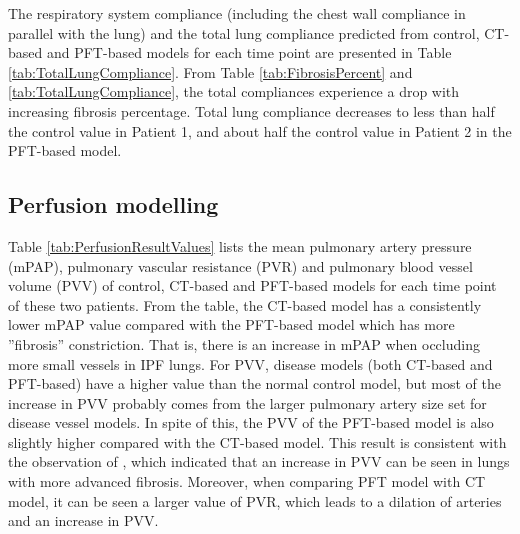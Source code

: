 The respiratory system compliance (including the chest wall compliance in parallel with the lung) and the total lung compliance predicted from control, CT-based and PFT-based models for each time point are presented in Table \ref{tab:TotalLungCompliance}. From Table \ref{tab:FibrosisPercent} and \ref{tab:TotalLungCompliance}, the total compliances experience a drop with increasing fibrosis percentage. Total lung compliance decreases to less than half the control value in Patient 1, and about half the control value in Patient 2 in the PFT-based model.

\subsection{Perfusion modelling}

Table \ref{tab:PerfusionResultValues} lists the mean pulmonary artery pressure (mPAP), pulmonary vascular resistance (PVR) and pulmonary blood vessel volume (PVV) of control, CT-based and PFT-based models for each time point of these two patients. From the table, the CT-based model has a consistently lower mPAP value compared with the PFT-based model which has more ''fibrosis'' constriction. That is, there is an increase in mPAP when occluding more small vessels in IPF lungs. For PVV, disease models (both CT-based and PFT-based) have a higher value than the normal control model, but most of the increase in PVV probably comes from the larger pulmonary artery size set for disease vessel models. In spite of this, the PVV of the PFT-based model is also slightly higher compared with the CT-based model. This result is consistent with the observation of \cite{Jacob2016Mortality, Jacob2016Evaluation}, which indicated that an increase in PVV can be seen in lungs with more advanced fibrosis. Moreover, when comparing PFT model with CT model, it can be seen a larger value of PVR, which leads to a dilation of arteries and an increase in PVV.

